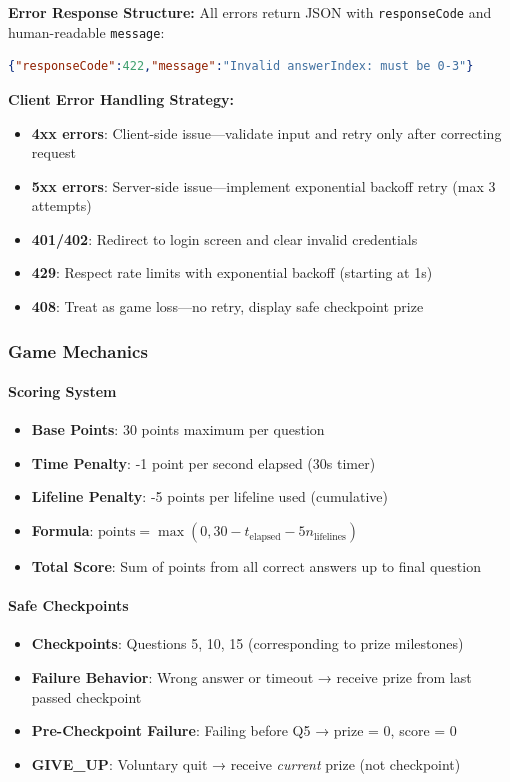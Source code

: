 \textbf{Error Response Structure:}
All errors return JSON with \texttt{responseCode} and human-readable \texttt{message}:
\begin{lstlisting}[language=json,basicstyle=\footnotesize\ttfamily]
{"responseCode":422,"message":"Invalid answerIndex: must be 0-3"}
\end{lstlisting}

\textbf{Client Error Handling Strategy:}
\begin{itemize}
    \item \textbf{4xx errors}: Client-side issue—validate input and retry only after correcting request
    \item \textbf{5xx errors}: Server-side issue—implement exponential backoff retry (max 3 attempts)
    \item \textbf{401/402}: Redirect to login screen and clear invalid credentials
    \item \textbf{429}: Respect rate limits with exponential backoff (starting at 1s)
    \item \textbf{408}: Treat as game loss—no retry, display safe checkpoint prize
\end{itemize}

\subsubsection{Game Mechanics}

\paragraph{Scoring System}
\begin{itemize}
    \item \textbf{Base Points}: 30 points maximum per question
    \item \textbf{Time Penalty}: -1 point per second elapsed (30s timer)
    \item \textbf{Lifeline Penalty}: -5 points per lifeline used (cumulative)
    \item \textbf{Formula}: $\text{points} = \max(0, 30 - t_{\text{elapsed}} - 5n_{\text{lifelines}})$
    \item \textbf{Total Score}: Sum of points from all correct answers up to final question
\end{itemize}

\paragraph{Safe Checkpoints}
\begin{itemize}
    \item \textbf{Checkpoints}: Questions 5, 10, 15 (corresponding to prize milestones)
    \item \textbf{Failure Behavior}: Wrong answer or timeout → receive prize from last passed checkpoint
    \item \textbf{Pre-Checkpoint Failure}: Failing before Q5 → prize = 0, score = 0
    \item \textbf{GIVE\_UP}: Voluntary quit → receive \textit{current} prize (not checkpoint)
\end{itemize}

